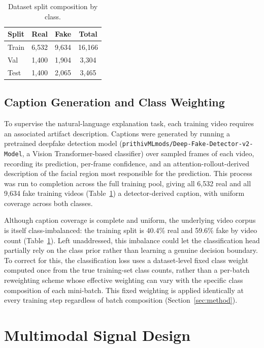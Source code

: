 \documentclass[acmsmall,review=false]{acmart}
\begin{document}
\begin{table}[h]
\centering
\caption{Dataset split composition by class.}
\label{tab:splits}
\begin{tabular}{lccc}
\toprule
\textbf{Split} & \textbf{Real} & \textbf{Fake} & \textbf{Total} \\
\midrule
Train & 6,532 & 9,634 & 16,166 \\
Val   & 1,400 & 1,904 & 3,304 \\
Test  & 1,400 & 2,065 & 3,465 \\
\bottomrule
\end{tabular}
\end{table}

\subsection{Caption Generation and Class Weighting}

To supervise the natural-language explanation task, each training video
requires an associated artifact description. Captions were generated by
running a pretrained deepfake detection model
(\texttt{prithivMLmods/Deep-Fake-Detector-v2-Model}, a Vision Transformer-based
classifier) over sampled frames of each video, recording its prediction,
per-frame confidence, and an attention-rollout-derived description of the
facial region most responsible for the prediction. This process was run to
completion across the full training pool, giving all 6,532 real and all 9,634
fake training videos (Table~\ref{tab:splits}) a detector-derived caption, with
uniform coverage across both classes.

Although caption coverage is complete and uniform, the underlying video corpus
is itself class-imbalanced: the training split is 40.4\% real and 59.6\% fake
by video count (Table~\ref{tab:splits}). Left unaddressed, this imbalance
could let the classification head partially rely on the class prior rather
than learning a genuine decision boundary. To correct for this, the
classification loss uses a dataset-level fixed class weight computed once
from the true training-set class counts, rather than a per-batch reweighting
scheme whose effective weighting can vary with the specific class composition
of each mini-batch. This fixed weighting is applied identically at every
training step regardless of batch composition (Section~\ref{sec:method}).

\section{Multimodal Signal Design}
\label{sec:signal}
\end{document}
